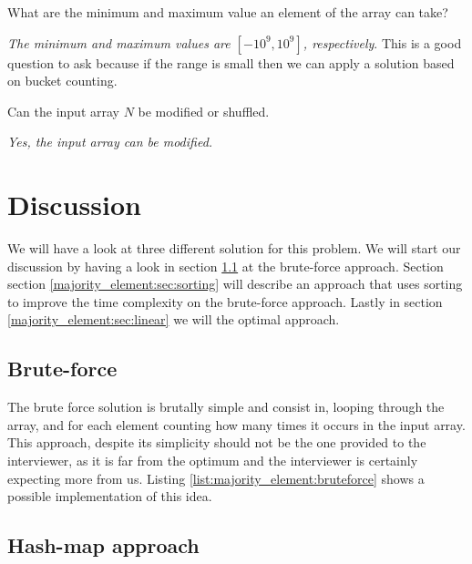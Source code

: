 \begin{QandA}
	\item What are the minimum and maximum value an element of the array can take? 
	\begin{answered}
		\textit{The minimum and maximum values are $[-10^9, 10^9]$, respectively}.
		This is a good question to ask because if the range is small then we can apply a solution based on bucket counting.
	\end{answered}

	\item Can the input array $N$ be modified or shuffled. 
	\begin{answered}
		\textit{Yes, the input array can be modified.}
	\end{answered}
\end{QandA}

\section{Discussion}
\label{majority_element:sec:discussion}
We will have a look at three different solution for this problem. We will start our discussion by having a look in section \ref{majority_element:sec:bruteforce} at the brute-force approach. Section section \ref{majority_element:sec:sorting} will describe an approach that uses sorting to improve the time complexity on the brute-force approach. Lastly in section \ref{majority_element:sec:linear} we will the optimal approach.

\subsection{Brute-force}
\label{majority_element:sec:bruteforce}
The brute force solution is brutally simple and consist in, looping through the array, and for each element counting how many times it occurs in the input array. This approach, despite its simplicity should not be the one provided to the interviewer, as it is far from the optimum and the interviewer is certainly expecting more from us.
Listing \ref{list:majority_element:bruteforce} shows a possible implementation of this idea. 




\subsection{Hash-map approach}
\label{majority_element:sec:hashmap}

